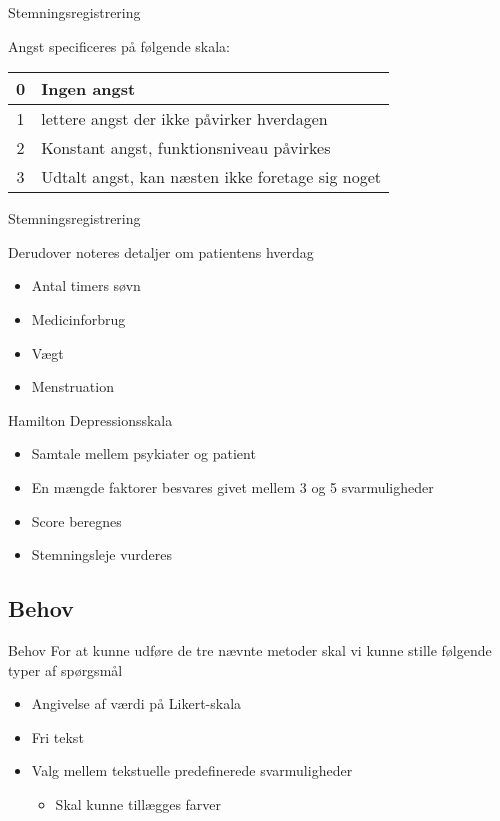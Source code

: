 { %
	\begin{frame}{Stemningsregistrering} %

		Angst specificeres på følgende skala:
		\begin{tabular}{| c | l|}
			\hline 0 & Ingen angst \\ 
			\hline 1 & lettere angst der ikke påvirker hverdagen\\ 
			\hline 2 & Konstant angst, funktionsniveau påvirkes\\ 
			\hline 3 & Udtalt angst, kan næsten ikke foretage sig noget\\
			\hline
		\end{tabular} 
	\end{frame}}
	
{ %
	\begin{frame}{Stemningsregistrering} %
		
		Derudover noteres detaljer om patientens hverdag
		\begin{itemize}
			\item Antal timers søvn
			\item Medicinforbrug
			\item Vægt
			\item Menstruation
		\end{itemize}
	\end{frame}}
	
{ %
\begin{frame}{Hamilton Depressionsskala} %
	\begin{itemize}
		\item Samtale mellem psykiater og patient
		\item En mængde faktorer besvares givet mellem 3 og 5 svarmuligheder
		\item Score beregnes
		\item Stemningsleje vurderes
	\end{itemize}
	
	
\end{frame}}
	
\subsection{Behov}
{ %
\begin{frame}{Behov} %
For at kunne udføre de tre nævnte metoder skal vi kunne stille følgende typer af spørgsmål


\begin{itemize}
	\item Angivelse af værdi på Likert-skala
	\item Fri tekst
	\item Valg mellem tekstuelle predefinerede svarmuligheder
	\begin{itemize}
		\item Skal kunne tillægges farver
	\end{itemize}
\end{itemize}
\end{frame}}

